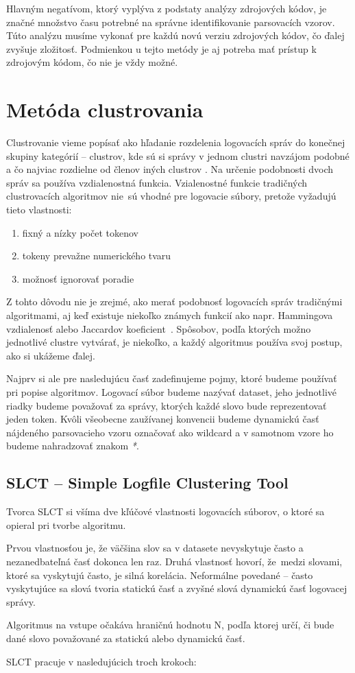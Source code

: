 Hlavným negatívom, ktorý vyplýva z podstaty analýzy zdrojových kódov, je značné množstvo času potrebné na správne identifikovanie parsovacích vzorov. Túto analýzu musíme vykonať pre každú novú verziu zdrojových kódov, čo ďalej zvyšuje zložitosť. Podmienkou u tejto metódy je aj potreba mať prístup k zdrojovým kódom, čo nie je vždy možné.

\section{ Metóda clustrovania}

Clustrovanie vieme popísať ako hľadanie rozdelenia logovacích správ do konečnej skupiny kategórií -- clustrov, kde sú si správy v jednom clustri navzájom podobné a čo najviac rozdielne od členov iných clustrov  \parencite{iplom}. Na určenie podobnosti dvoch správ sa používa vzdialenostná funkcia. Vzialenostné funkcie tradičných clustrovacích algoritmov nie~sú vhodné pre logovacie súbory, pretože vyžadujú tieto vlastnosti:

\begin{enumerate}
  \item fixný a nízky počet tokenov
  \item tokeny prevažne numerického tvaru
  \item možnosť ignorovať poradie
\end{enumerate}

Z tohto dôvodu nie je zrejmé, ako merať podobnosť logovacích správ tradičnými algoritmami, aj keď existuje niekoľko známych funk\-cií ako napr. Hammingova vzdialenosť alebo Jaccardov koeficient~\parencite{slct}. Spôsobov, podľa ktorých možno jednotlivé clustre vytvárať, je niekoľko, a každý algoritmus používa svoj postup, ako si ukážeme ďalej.
\par Najprv si ale pre nasledujúcu časť zadefinujeme pojmy, ktoré bude\-me používať pri popise algoritmov. Logovací súbor budeme nazývať dataset, jeho jednotlivé riadky budeme považovať za správy, ktorých každé slovo bude reprezentovať jeden token. Kvôli všeobecne zaužívanej konvencii budeme dynamickú časť nájdeného parsovacieho vzoru označovať ako wildcard a v samotnom vzore ho budeme nahra\-dzovať znakom \emph{*}.

\subsection{SLCT -- Simple Logfile Clustering Tool}
Tvorca SLCT \parencite{slct, slctloghound} si všíma dve kľúčové vlastnosti logovacích súborov, o ktoré sa opieral pri tvorbe algoritmu. \par Prvou vlastnosťou je, že väčšina slov sa v datasete nevyskytuje často a nezanedbateľná časť dokonca len raz. Druhá vlastnosť hovorí, že~medzi slovami, ktoré sa vyskytujú často, je silná korelácia. Neformál\-ne povedané -- často vyskytujúce sa slová tvoria statickú časť a zvyšné slová dynamickú časť logovacej správy.
\par Algoritmus na vstupe očakáva hraničnú hodnotu N, podľa ktorej určí, či bude dané slovo považované za statickú alebo dynamickú časť. 
\par SLCT pracuje v nasledujúcich troch krokoch:

